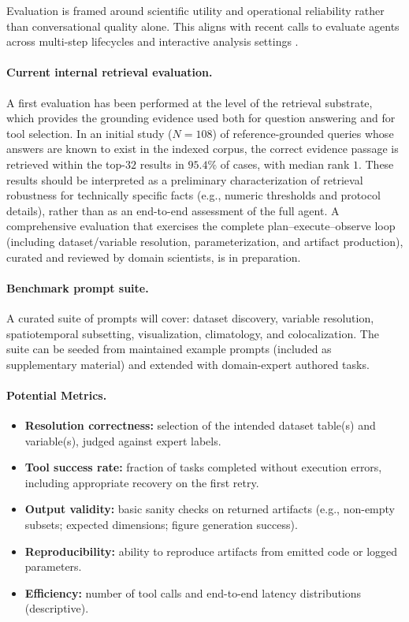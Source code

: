 Evaluation is framed around scientific utility and operational reliability rather than conversational quality alone.
This aligns with recent calls to evaluate agents across multi-step lifecycles and interactive analysis settings \citep{Zhang2024DSEval,Li2025IDABench}.

\paragraph{Current internal retrieval evaluation.}
A first evaluation has been performed at the level of the retrieval substrate, which provides the grounding evidence used both for question answering and for tool selection.
In an initial study ($N=108$) of reference-grounded queries whose answers are known to exist in the indexed corpus, the correct evidence passage is retrieved within the top-$32$ results in $95.4\%$ of cases, with median rank $1$.
These results should be interpreted as a preliminary characterization of retrieval robustness for technically specific facts (e.g., numeric thresholds and protocol details), rather than as an end-to-end assessment of the full agent.
A comprehensive evaluation that exercises the complete plan--execute--observe loop (including dataset/variable resolution, parameterization, and artifact production), curated and reviewed by domain scientists, is in preparation.

\paragraph{Benchmark prompt suite.}
A curated suite of prompts will cover: dataset discovery, variable resolution, spatiotemporal subsetting, visualization, climatology, and colocalization.
The suite can be seeded from maintained example prompts (included as supplementary material) and extended with domain-expert authored tasks.

\paragraph{Potential Metrics.}
\begin{itemize}[leftmargin=*]
  \item \textbf{Resolution correctness:} selection of the intended dataset table(s) and variable(s), judged against expert labels.
  \item \textbf{Tool success rate:} fraction of tasks completed without execution errors, including appropriate recovery on the first retry.
  \item \textbf{Output validity:} basic sanity checks on returned artifacts (e.g., non-empty subsets; expected dimensions; figure generation success).
  \item \textbf{Reproducibility:} ability to reproduce artifacts from emitted code or logged parameters.
  \item \textbf{Efficiency:} number of tool calls and end-to-end latency distributions (descriptive).
\end{itemize}

